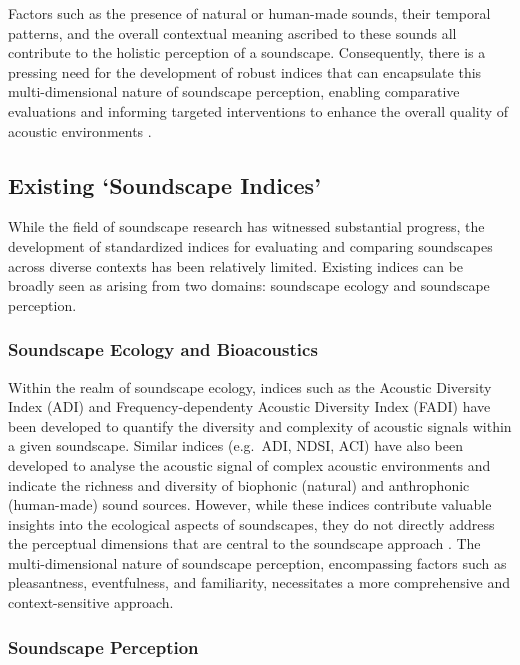 \documentclass[
  authoryear,
  preprint,
  3p]{elsarticle}
\begin{document}
Factors such as the presence of natural or human-made sounds, their
temporal patterns, and the overall contextual meaning ascribed to these
sounds all contribute to the holistic perception of a soundscape.
Consequently, there is a pressing need for the development of robust
indices that can encapsulate this multi-dimensional nature of soundscape
perception, enabling comparative evaluations and informing targeted
interventions to enhance the overall quality of acoustic environments
\citep{Chen2023Developing}.

\subsection{Existing `Soundscape
Indices'}\label{existing-soundscape-indices}

While the field of soundscape research has witnessed substantial
progress, the development of standardized indices for evaluating and
comparing soundscapes across diverse contexts has been relatively
limited. Existing indices can be broadly seen as arising from two
domains: soundscape ecology and soundscape perception.

\subsubsection{Soundscape Ecology and
Bioacoustics}\label{soundscape-ecology-and-bioacoustics}

Within the realm of soundscape ecology, indices such as the Acoustic
Diversity Index (ADI) and Frequency-dependenty Acoustic Diversity Index
(FADI) \citep{Xu2023frequency} have been developed to quantify the
diversity and complexity of acoustic signals within a given soundscape.
Similar indices (e.g.~ADI, NDSI, ACI) have also been developed to
analyse the acoustic signal of complex acoustic environments and
indicate the richness and diversity of biophonic (natural) and
anthrophonic (human-made) sound sources. However, while these indices
contribute valuable insights into the ecological aspects of soundscapes,
they do not directly address the perceptual dimensions that are central
to the soundscape approach \citep{SchulteFortkamp2023Soundscapes}. The
multi-dimensional nature of soundscape perception, encompassing factors
such as pleasantness, eventfulness, and familiarity, necessitates a more
comprehensive and context-sensitive approach.

\subsubsection{Soundscape Perception}\label{soundscape-perception}
\end{document}
